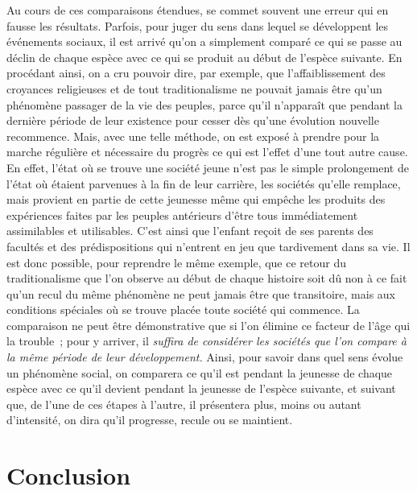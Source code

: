\documentclass[french,twoside]{book} %
\newcommand\chapteropen{} %
\newcommand\chapterclose{} %
\begin{document}
Au cours de ces comparaisons étendues, se commet souvent une erreur qui en fausse les résultats. Parfois, pour juger du sens dans lequel se développent les événements sociaux, il est arrivé qu’on a simplement comparé ce qui se passe au déclin de chaque espèce avec ce qui se produit au début de l’espèce suivante. En procédant ainsi, on a cru pouvoir dire, par exemple, que l’affaiblissement des croyances religieuses et de tout traditionalisme ne pouvait jamais être qu’un phénomène passager de la vie des peuples, parce qu’il n’apparaît que pendant la dernière période de leur existence pour cesser dès qu’une évolution nouvelle recommence. Mais, avec une telle méthode, on est exposé à prendre pour la marche régulière et nécessaire du progrès ce qui est l’effet d’une tout autre cause. En effet, l’état où se trouve une société jeune n’est pas le simple prolongement de l’état où étaient parvenues à la fin de leur carrière, les sociétés qu’elle remplace, mais provient en partie de cette jeunesse même qui empêche les produits des expériences faites par les peuples antérieurs d’être tous immédiatement assimilables et utilisables. C’est ainsi que l’enfant reçoit de ses parents des facultés et des prédispositions qui n’entrent en jeu que tardivement dans sa vie. Il est donc possible, pour reprendre le même exemple, que ce retour du traditionalisme que l’on observe au début de chaque histoire soit dû non à ce fait qu’un recul du même phénomène ne peut jamais être que transitoire, mais aux conditions spéciales où se trouve placée toute société qui commence. La comparaison ne peut être démonstrative que si l’on élimine ce facteur de l’âge qui la trouble ; pour y arriver, il {\itshape suffira de considérer les sociétés que l’on compare à la même période de leur développement.} Ainsi, pour savoir dans quel sens évolue un phénomène social, on comparera ce qu’il est pendant la jeunesse de chaque espèce avec ce qu’il devient pendant la jeunesse de l’espèce suivante, et suivant que, de l’une de ces étapes à l’autre, il présentera plus, moins ou autant d’intensité, on dira qu’il progresse, recule ou se maintient.
\chapterclose


\chapteropen
\chapter[{Conclusion}]{Conclusion}
\label{conclusion}\renewcommand{\leftmark}{Conclusion}
\end{document}
